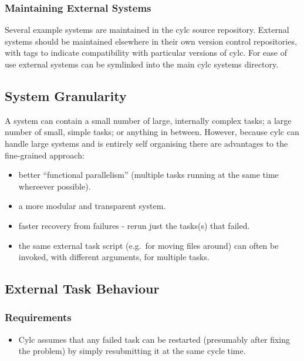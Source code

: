 \documentclass[11pt,a4paper]{article}
\begin{document}
\subsubsection{Maintaining External Systems}

Several example systems are maintained in the cylc source repository.
External systems should be maintained elsewhere in their own version
control repositories, with tags to indicate compatibility with
particular versions of cylc. For ease of use external systems can be
symlinked into the main cylc systems directory.


\subsection{System Granularity} 
\label{System Granularity}

A system can contain a small number of large, internally complex tasks;
a large number of small, simple tasks; or anything in between. However,
because cylc can handle large systems and is entirely self organising
there are advantages to the fine-grained approach: 

\begin{itemize}
    \item better ``functional parallelism'' (multiple tasks running
        at the same time whereever possible).
    \item a more modular and transparent system.
    \item faster recovery from failures - rerun just the tasks(s) that
        failed. 
    \item the same external task script (e.g.\ for moving files around)
        can often be invoked, with different arguments, for multiple
        tasks.
\end{itemize}

\subsection{External Task Behaviour} 
\label{ExternalTaskBehaviour}

\subsubsection{Requirements}

\begin{itemize}
    \item Cylc assumes that any failed task can be restarted (presumably
        after fixing the problem) by simply resubmitting it at the same
        cycle time.
\end{itemize}
\end{document}
